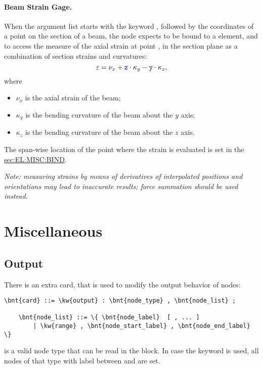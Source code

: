 \paragraph{Beam Strain Gage.}
\label{sec:NODE:PARAMETER:BEAM_STRAIN_GAGE}
When the argument list starts with the keyword ,
followed by the coordinates of a point on the section of a beam,
the  node expects to be bound to a  element,
and to access the measure of the axial strain at point , 
in the section plane as a combination of section strains and curvatures:
\begin{equation}
	\varepsilon = \nu_x
		+ \textcolor{blue}{\texttt{z}} \cdot \kappa_y 
		- \textcolor{blue}{\texttt{y}} \cdot \kappa_z ,
\end{equation}
where
\begin{itemize}
\item $\nu_x$ is the axial strain of the beam;
\item $\kappa_y$ is the bending curvature of the beam about the $y$ axis;
\item $\kappa_z$ is the bending curvature of the beam about the $z$ axis.
\end{itemize}
The span-wise location of the point where the strain is evaluated
is set in the 
\hyperref{\kwnd{bind} statement}{\kw{bind} statement (see Section~}{)}{sec:EL:MISC:BIND}.

\emph{Note: measuring strains by means of derivatives of interpolated
positions and orientations may lead to inaccurate results; force summation
should be used instead.}





\section{Miscellaneous}

\subsection{Output}
\label{sec:NODE:MISC:OUTPUT}
There is an extra card, that is used to modify the output behavior of nodes:  
\begin{Verbatim}[commandchars=\\\{\}]
    \bnt{card} ::= \kw{output} : \bnt{node_type} , \bnt{node_list} ;

    \bnt{node_list} ::= \{ \bnt{node_label}  [ , ... ] 
        | \kw{range} , \bnt{node_start_label} , \bnt{node_end_label} \}
\end{Verbatim}
 is a valid node type that can be read in the 
block.
In case the keyword  is used, all nodes of that type
with label between  and 
are set.

